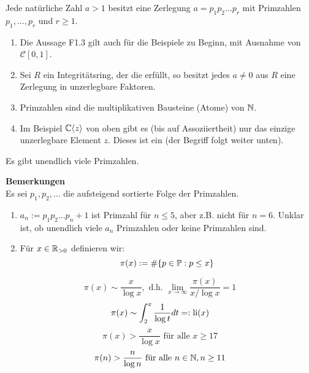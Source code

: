 \setcounter{countfalko}{2}
\begin{falko} \label{F1.3'}
	Jede natürliche Zahl $a > 1$ besitzt eine Zerlegung $a = p_1p_2 \dots p_r$ mit Primzahlen $p_1,\dots,p_r$ und $r \geq 1$.
\end{falko}

	\begin{enumerate}[1)]
		\item Die Aussage F1.3 gilt auch für die Beispiele zu Beginn, mit Ausnahme von $\mathcal{C}[0,1]$.
		\item Sei $R$ ein Integritätsring, der die  erfüllt, so besitzt jedes $a \neq 0$ aus $R$ eine Zerlegung in unzerlegbare Faktoren.
		\item Primzahlen sind die multiplikativen Bausteine (Atome) von $\mathbb{N}$.
		\item Im Beispiel $\mathbb{C}\langle z\rangle$ von oben gibt es (bis auf Assoziiertheit) nur das einzige unzerlegbare Element $z$. Dieses ist ein  (der Begriff folgt weiter unten).
	\end{enumerate}
	
\begin{satz} \label{satz_1.1}
	Es gibt unendlich viele Primzahlen.
\end{satz}

\textbf{Bemerkungen} \\
	Es sei $p_1,p_2,\dots$ die aufsteigend sortierte Folge der Primzahlen.
	\begin{enumerate}[1)]
		\item $a_n := p_1p_2\dots p_n +1$ ist Primzahl für $n \leq 5$, aber z.B. nicht für $n = 6$. Unklar ist, ob unendlich viele $a_n$ Primzahlen oder keine Primzahlen sind.
		\item Für $x \in \mathbb{R}_{>0}$ definieren wir:
		\[ \pi(x) := \# \{p \in \mathbb{P} : p \leq x\}\]
	\end{enumerate}

	\begin{equation}
		\pi(x) \sim \frac{x}{\log x}, \text{ d.h. } \lim\limits_{x \rightarrow \infty} \frac{\pi(x)}{x / \log x} = 1 \label{eq_primzahlsatz1}
	\end{equation}
	\begin{equation}
		\pi(x) \sim \int_{2}^{x} \frac{1}{\log t} dt =: \operatorname{li}(x) \label{eq_primzahlsatz_2}
	\end{equation}
	\begin{equation}
	\pi(x) > \frac{x}{\log x} \text{ für alle } x \geq 17 \label{eq_primzahlsatz_3}
	\end{equation}
	\begin{equation}
	\pi(n) > \frac{n}{\log n} \text{ für alle } n \in \mathbb{N}, n \geq 11 \label{eq_primzahlsatz_4}
	\end{equation}
	
